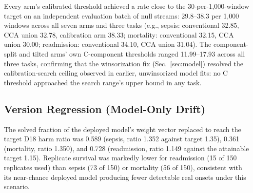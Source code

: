 \documentclass[apajournal,article,submit,oneauthor]{Definitions/mdpi}
\begin{document}
Every arm's calibrated threshold achieved a rate close to the 30-per-1{,}000-window target on an independent evaluation batch of null streams: 29.8--38.3 per 1{,}000 windows across all seven arms and three tasks (e.g., sepsis: conventional 32.85, CCA union 32.78, calibration arm 38.33; mortality: conventional 32.15, CCA union 30.00; readmission: conventional 34.10, CCA union 31.04). The component-split and tilted arms' own C-component thresholds ranged 11.99--17.93 across all three tasks, confirming that the winsorization fix (Sec.~\ref{sec:model}) resolved the calibration-search ceiling observed in earlier, unwinsorized model fits: no C threshold approached the search range's upper bound in any task.

\subsection{Version Regression (Model-Only Drift)}\label{sec:results-sc17}

The solved fraction of the deployed model's weight vector replaced to reach the target D18 harm ratio was 0.589 (sepsis, ratio 1.352 against target 1.35), 0.361 (mortality, ratio 1.350), and 0.728 (readmission, ratio 1.149 against the attainable target 1.15). Replicate survival was markedly lower for readmission (15 of 150 replicates used) than sepsis (73 of 150) or mortality (56 of 150), consistent with its near-chance deployed model producing fewer detectable real onsets under this scenario.
\end{document}
